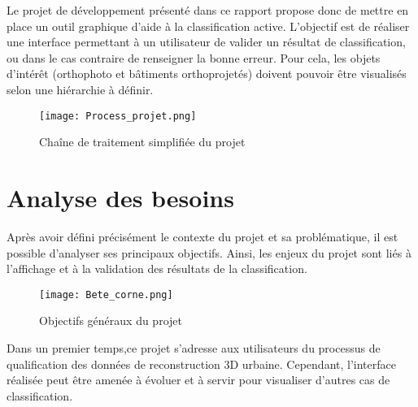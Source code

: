 Le projet de développement présenté dans ce rapport propose donc de mettre en place un outil graphique d'aide à la classification active. L'objectif est de réaliser une interface permettant à un utilisateur de valider un résultat de classification, ou dans le cas contraire de renseigner la bonne erreur. Pour cela, les objets d'intérêt (orthophoto et bâtiments orthoprojetés) doivent pouvoir être visualisés selon une hiérarchie à définir.\newline

\begin{figure}[!h]
	\begin{center}
		\texttt{[image: Process\_projet.png]}  \\
		\caption[Chaîne de traitement simplifiée du projet]{Chaîne de traitement simplifiée du projet}
		\label{fig:processprojet}
	\end{center}
\end{figure}

\section{Analyse des besoins}

Après avoir défini précisément le contexte du projet et sa problématique, il est possible d'analyser ses principaux objectifs. Ainsi, les enjeux du projet sont liés à l'affichage et à la validation des résultats de la classification.

\begin{figure}[!h]
	\begin{center}
		\texttt{[image: Bete\_corne.png]}  \\
		\caption[Objectifs généraux du projet]{Objectifs généraux du projet}
		\label{fig:betecorne}
	\end{center}
\end{figure}

Dans un premier temps,ce projet s'adresse aux utilisateurs du processus de qualification des données de reconstruction 3D urbaine. Cependant, l'interface réalisée peut être amenée à évoluer et à servir pour visualiser d'autres cas de classification. 
